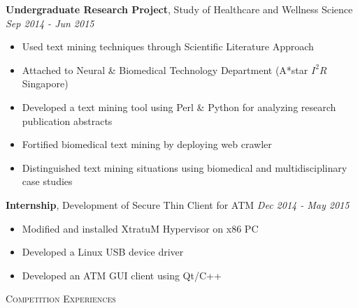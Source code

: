 \documentclass[a4paper, 12pt]{article}
\newenvironment{changemargin}[2]{%
  \begin{list}{}{%
      \setlength{\topsep}{0pt}%
      \setlength{\leftmargin}{#1}%
      \setlength{\rightmargin}{#2}%
      \setlength{\listparindent}{\parindent}%
      \setlength{\itemindent}{\parindent}%
      \setlength{\parsep}{\parskip}%
    }%
  \item[]}{\end{list}
}
\newcommand{\lineover}{
  \begin{changemargin}{-0.05in}{-0.05in}
    \vspace*{-8pt}
    \hrulefill \\
    \vspace*{-2pt}
  \end{changemargin}
}
\newcommand{\header}[1]{
  \begin{changemargin}{-0.6in}{-0.6in}
    \fontsize{15}{15}\scshape{#1}\\
    \lineover
    \vspace*{-4pt}
  \end{changemargin}
}
\newenvironment{body}
{
\vspace*{-16pt}
\begin{changemargin}{-0.25in}{-0.5in}
}
{
\end{changemargin}
}
\begin{document}
\begin{body}
  \textbf{Undergraduate Research Project}, {Study of Healthcare and Wellness Science} \hfill \emph{Sep 2014 - Jun 2015}\\
  \vspace*{-6pt}
  \begin{itemize} \itemsep -0pt  \small
  \item Used text mining techniques through Scientific Literature Approach
  \item Attached to Neural \& Biomedical Technology Department (A*star $I^{2}R$ Singapore)
  \item Developed a text mining tool using Perl \& Python for analyzing research publication abstracts
  \item Fortified biomedical text mining by deploying web crawler
  \item Distinguished text mining situations using biomedical and multidisciplinary case studies
  \end{itemize}

  \textbf{Internship}, {Development of Secure Thin Client for ATM} \hfill \emph{Dec 2014 - May 2015}\\
  \vspace*{-6pt}
  \begin{itemize} \itemsep -0pt  \small
  \item Modified and installed XtratuM Hypervisor on x86 PC
  \item Developed a Linux USB device driver
  \item Developed an ATM GUI client using Qt/C++
  \end{itemize}
\end{body}

\header{Competition Experiences}
\end{document}
